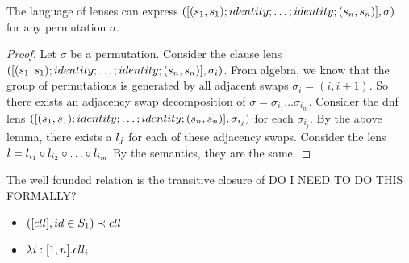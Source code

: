 \begin{lemma}
The language of lenses can express $([(s_1,s_1) ; identity ; \ldots ; identity ; (s_n,s_n)], \sigma)$
for any permutation $\sigma$.
\begin{proof}
Let $\sigma$ be a permutation.
Consider the clause lens $([(s_1,s_1) ; identity ; \ldots ; identity ; (s_n,s_n)], \sigma_{i})$.
From algebra, we know that the group of permutations is generated by all
adjacent swaps $\sigma_i = (i,i+1)$.
So there exists an adjacency swap decomposition of $\sigma = \sigma_{i_1}\ldots\sigma_{i_m}$.
Consider the dnf lens $([(s_1,s_1) ; identity ; \ldots ; identity ; (s_n,s_n)], \sigma_{i_j})$ for each $\sigma_{i_j}$.
By the above lemma, there exists a $l_j$ for each of these adjacency swaps.
Consider the lens $l = l_{i_1} \circ l_{i_2} \circ \ldots  \circ l_{i_m}$
By the semantics, they are the same.

\end{proof}
\end{lemma}

\begin{definition}
The well founded relation is the transitive closure of
DO I NEED TO DO THIS FORMALLY?
\begin{itemize}
\item $([cll],id \in S_1) \prec cll$
\item $\lambda i:[1,n].cll_i$
\end{itemize}
\end{definition}

